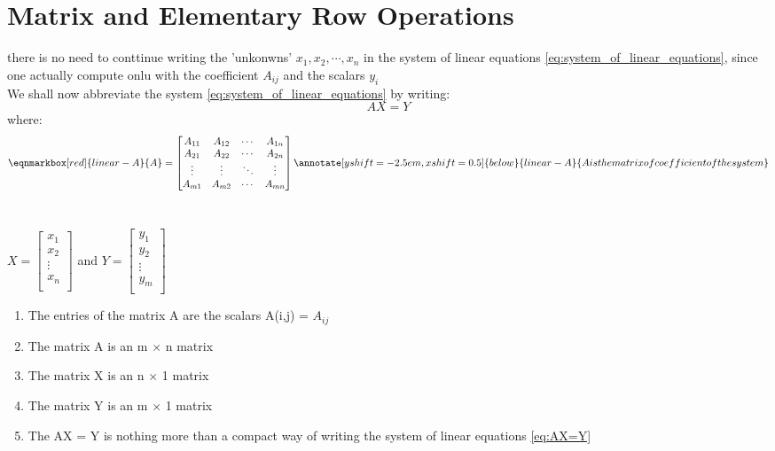 \documentclass[11pt, a4paper, oneside,UTF8]{ctexbook}
\newtheorem[M]{theorem}{Theorem}[section]
\newtheorem[M]{lemma}[theorem]{Lemma}
\newtheorem[M]{proposition}[theorem]{Proposition}
\newtheorem[M]{corollary}[theorem]{Corollary}
\newtheorem[M]{definition}{Definition}[section]
\newtheorem[M]{example}{Example}[section]
\newtheorem[M]{remark}{Remark}[section]
\begin{document}
\section{Matrix and Elementary Row Operations}
there is no need to conttinue writing the 'unkonwns' $x_1,x_2,\cdots,x_n$ in the system of linear equations \ref{eq:system_of_linear_equations},
since one actually compute onlu with the coefficient $A_{ij}$ and the scalars  $y_i$\\
We shall now abbreviate the system \ref{eq:system_of_linear_equations} by writing:
\[
	AX=Y
	\label{eq:AX=Y}
\]
where:
\begin{equation}
	\eqnmarkbox[red]{linear-A}{A} = \begin{bmatrix}
		A_{11} & A_{12} & \cdots & A_{1n} \\
		A_{21} & A_{22} & \cdots & A_{2n} \\
		\vdots & \vdots & \ddots & \vdots \\
		A_{m1} & A_{m2} & \cdots & A_{mn} \\
	\end{bmatrix}
	\annotate[yshift=-2.5em,xshift=0.5]{below}{linear-A}{A is the matrix of coefficient of the system}
	\label{eq:A equals}
\end{equation}
\\
\begin{center}


	$
		X = \begin{bmatrix}
			x_1    \\
			x_2    \\
			\vdots \\
			x_n    \\
		\end{bmatrix}
	$ \quad and \quad $
		Y = \begin{bmatrix}
			y_1    \\
			y_2    \\
			\vdots \\
			y_m    \\
		\end{bmatrix}
	$
\end{center}
\begin{remark}
	\begin{enumerate}
		\item The entries of the matrix A are the scalars A(i,j) = $A_{ij}$
		\item The matrix A is an m $\times$ n matrix
		\item The matrix X is an n $\times$ 1 matrix
		\item The matrix Y is an m $\times$ 1 matrix
		\item The AX = Y is nothing more than a compact way of writing the system of linear equations
		      \ref{eq:AX=Y}
	\end{enumerate}
\end{remark}
\end{document}
